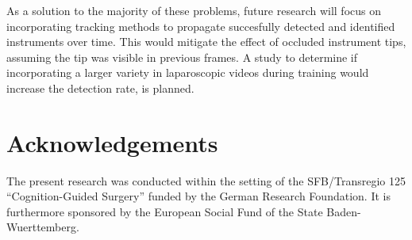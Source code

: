 \documentclass{llncs}
\begin{document}
As a solution to the majority of these problems, future research will focus on incorporating tracking methods to propagate succesfully detected and identified instruments over time.
This would mitigate the effect of occluded instrument tips, assuming the tip was visible in previous frames.
A study to determine if incorporating a larger variety in laparoscopic videos during training would increase the detection rate, is planned.

\section{Acknowledgements}
\label{acknowledgments}
The present research was conducted within the setting of the SFB/Transregio 125 ``Cognition-Guided Surgery'' funded by the German Research Foundation. It is furthermore sponsored by the European Social Fund of the State Baden-Wuerttemberg.


\end{document}
